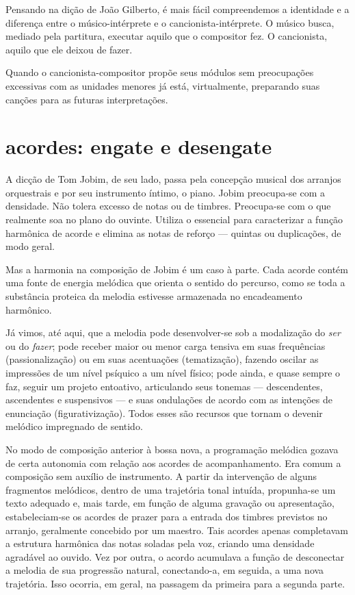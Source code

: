 Pensando na dição de João Gilberto, é mais fácil compreendemos a
identidade e a diferença entre o músico-intérprete e o
cancionista-intérprete. O músico busca, mediado pela partitura, executar
aquilo que o compositor fez. O cancionista, aquilo que ele deixou de
fazer.

Quando o cancionista-compositor propõe seus módulos sem preocupações
excessivas com as unidades menores já está, virtualmente, preparando
suas canções para as futuras interpretações.

\section{acordes: engate e desengate}

A dicção de Tom Jobim, de seu lado, passa pela concepção musical dos
arranjos orquestrais e por seu instrumento íntimo, o piano. Jobim
preocupa-se com a densidade. Não tolera excesso de notas ou de timbres.
Preocupa-se com o que realmente soa no plano do ouvinte. Utiliza o
essencial para caracterizar a função harmônica de acorde e elimina as
notas de reforço --- quintas ou duplicações, de modo geral.

Mas a harmonia na composição de Jobim é um caso à parte. Cada acorde
contém uma fonte de energia melódica que orienta o sentido do percurso,
como se toda a substância proteica da melodia estivesse armazenada no
encadeamento harmônico.

Já vimos, até aqui, que a melodia pode desenvolver-se sob a modalização
do \textit{ser} ou do \textit{fazer}; pode receber maior ou menor carga tensiva em suas
frequências (passionalização) ou em suas acentuações (tematização),
fazendo oscilar as impressões de um nível psíquico a um nível físico;
pode ainda, e quase sempre o faz, seguir um projeto entoativo,
articulando seus tonemas --- descendentes, ascendentes e suspensivos --- e
suas ondulações de acordo com as intenções de enunciação
(figurativização). Todos esses são recursos que tornam o devenir
melódico impregnado de sentido.

No modo de composição anterior à bossa nova, a programação melódica
gozava de certa autonomia com relação aos acordes de acompanhamento. Era
comum a composição sem auxílio de instrumento. A partir da intervenção
de alguns fragmentos melódicos, dentro de uma trajetória tonal intuída,
propunha-se um texto adequado e, mais tarde, em função de alguma
gravação ou apresentação, estabeleciam-se os acordes de prazer para a
entrada dos timbres previstos no arranjo, geralmente concebido por um
maestro. Tais acordes apenas completavam a estrutura harmônica das
notas soladas pela voz, criando uma densidade agradável ao ouvido. Vez
por outra, o acordo acumulava a função de desconectar a melodia de sua
progressão natural, conectando-a, em seguida, a uma nova trajetória. Isso ocorria, em geral,
na passagem da primeira para a segunda parte.

